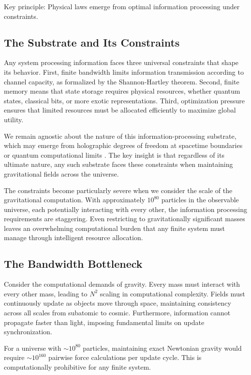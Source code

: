 \documentclass[usenatbib]{mnras}
\begin{document}
Key principle: Physical laws emerge from optimal information processing under constraints.

\subsection{The Substrate and Its Constraints}

Any system processing information faces three universal constraints that shape its behavior. First, finite bandwidth limits information transmission according to channel capacity, as formalized by the Shannon-Hartley theorem. Second, finite memory means that state storage requires physical resources, whether quantum states, classical bits, or more exotic representations. Third, optimization pressure ensures that limited resources must be allocated efficiently to maximize global utility.

We remain agnostic about the nature of this information-processing substrate, which may emerge from holographic degrees of freedom at spacetime boundaries \citep{susskind1995} or quantum computational limits \citep{lloyd2002}. The key insight is that regardless of its ultimate nature, any such substrate faces these constraints when maintaining gravitational fields across the universe.

The constraints become particularly severe when we consider the scale of the gravitational computation. With approximately $10^{80}$ particles in the observable universe, each potentially interacting with every other, the information processing requirements are staggering. Even restricting to gravitationally significant masses leaves an overwhelming computational burden that any finite system must manage through intelligent resource allocation.

\subsection{The Bandwidth Bottleneck}

Consider the computational demands of gravity. Every mass must interact with every other mass, leading to $N^2$ scaling in computational complexity. Fields must continuously update as objects move through space, maintaining consistency across all scales from subatomic to cosmic. Furthermore, information cannot propagate faster than light, imposing fundamental limits on update synchronization.

For a universe with $\sim 10^{80}$ particles, maintaining exact Newtonian gravity would require $\sim 10^{160}$ pairwise force calculations per update cycle. This is computationally prohibitive for any finite system.
\end{document}
